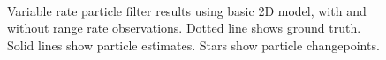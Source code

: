 \documentclass[conference]{IEEEtran}
\begin{document}
\begin{figure}[!t]
\centering
{}
\\
\caption{Variable rate particle filter results using basic 2D model, with and without range rate observations. Dotted line shows ground truth. Solid lines show particle estimates. Stars show particle changepoints.}
\label{fig:2D_Model1}
\end{figure}
\end{document}
